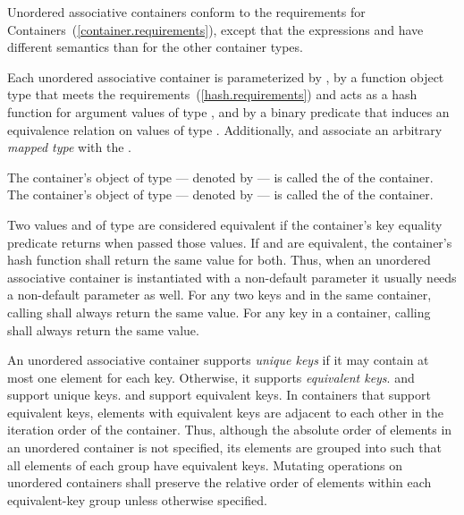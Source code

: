 \pnum
{}%
%
%
Unordered associative containers conform to the requirements for
Containers~(\ref{container.requirements}), except that
the expressions
 and  have different semantics than for the other
container types.

\pnum
Each unordered associative container is parameterized by ,
by a function object type  that meets the 
requirements~(\ref{hash.requirements}) and acts as a hash function for
argument values of type , and by a binary predicate 
that induces an equivalence relation on values of type .
Additionally,  and  associate
an arbitrary \textit{mapped type}  with the .

\pnum
{}%
%
The container's object of type  --- denoted by
 --- is called the  of the
container. The container's object of type  ---
denoted by  --- is called the
 of the container.

\pnum
{}%
Two values  and  of type  are
considered equivalent if the container's
key equality predicate returns
 when passed those values.  If  and
 are equivalent, the container's hash function shall
return the same value for both.
\enternote Thus, when an unordered associative container is instantiated with
a non-default  parameter it usually needs a non-default 
parameter as well. \exitnote
For any two keys  and  in the same container,
calling  shall always return the same value.
For any key  in a container, calling 
shall always return the same value.

\pnum
{}%
%
An unordered associative container supports \textit{unique keys} if it
may contain at most one element for each key.  Otherwise, it supports
\textit{equivalent keys}.   and 
support unique keys.  and 
support equivalent keys.  In containers that support equivalent keys,
elements with equivalent keys are adjacent to each other
in the iteration order of the container. Thus, although the absolute order
of elements in an unordered container is not specified, its elements are
grouped into  such that all elements of each
group have equivalent keys. Mutating operations on unordered containers shall
preserve the relative order of elements within each equivalent-key group
unless otherwise specified.

